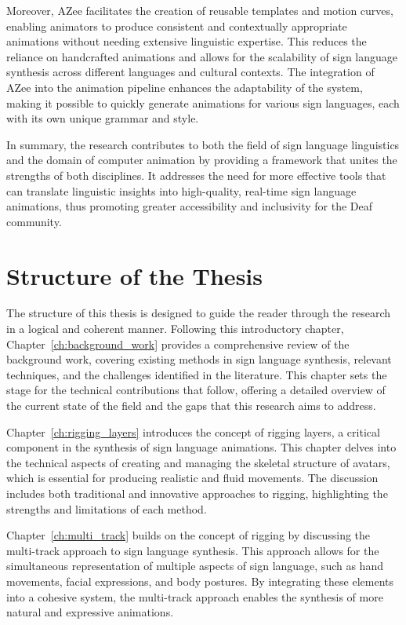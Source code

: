 \documentclass[../../main.tex]{subfiles}
\begin{document}
Moreover, AZee facilitates the creation of reusable templates and motion curves, enabling animators to produce consistent and contextually appropriate animations without needing extensive linguistic expertise. This reduces the reliance on handcrafted animations and allows for the scalability of sign language synthesis across different languages and cultural contexts. The integration of AZee into the animation pipeline enhances the adaptability of the system, making it possible to quickly generate animations for various sign languages, each with its own unique grammar and style.

In summary, the research contributes to both the field of sign language linguistics and the domain of computer animation by providing a framework that unites the strengths of both disciplines. It addresses the need for more effective tools that can translate linguistic insights into high-quality, real-time sign language animations, thus promoting greater accessibility and inclusivity for the Deaf community.

\section{Structure of the Thesis}

The structure of this thesis is designed to guide the reader through the research in a logical and coherent manner. Following this introductory chapter, Chapter~\ref{ch:background_work} provides a comprehensive review of the background work, covering existing methods in sign language synthesis, relevant techniques, and the challenges identified in the literature. This chapter sets the stage for the technical contributions that follow, offering a detailed overview of the current state of the field and the gaps that this research aims to address.

Chapter~\ref{ch:rigging_layers} introduces the concept of rigging layers, a critical component in the synthesis of sign language animations. This chapter delves into the technical aspects of creating and managing the skeletal structure of avatars, which is essential for producing realistic and fluid movements. The discussion includes both traditional and innovative approaches to rigging, highlighting the strengths and limitations of each method.

Chapter~\ref{ch:multi_track} builds on the concept of rigging by discussing the multi-track approach to sign language synthesis. This approach allows for the simultaneous representation of multiple aspects of sign language, such as hand movements, facial expressions, and body postures. By integrating these elements into a cohesive system, the multi-track approach enables the synthesis of more natural and expressive animations.
\end{document}
